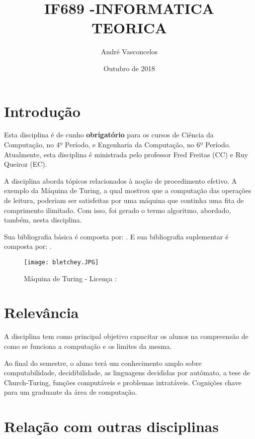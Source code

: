\documentclass{article}
\title{IF689 -INFORMATICA TEORICA}
\author{André Vasconcelos}
\date{Outubro de 2018}
\begin{document}
\maketitle

\section{Introdução}
Esta disciplina é de cunho \textbf{obrigatório} para os cursos de Ciência da Computação, no 4º Período, e Engenharia da Computação, no 6º Período. Atualmente, esta disciplina é ministrada pelo professor Fred Freitas (CC) e Ruy Queiroz (EC).

A disciplina aborda tópicos relacionados à noção de procedimento efetivo. A exemplo da Máquina de Turing, a qual mostrou que a computação das operações de leitura, poderiam ser satisfeitas por uma máquina que continha uma fita de comprimento ilimitado. Com isso, foi gerado o termo algoritmo, abordado, também, nesta disciplina.

Sua bibliografia básica é composta por: \cite{1}. E sua bibliografia suplementar é composta por: \cite{2} \cite{3} \cite{4} \cite{5}.
    \begin{figure}[h!]
    \centering
    \texttt{[image: bletchey.JPG]}
    \caption{Máquina de Turing - Licença : \cite{10}}
    \label{fig:universe}
    \end{figure}
    
    
\section{Relevância}
A disciplina tem como principal objetivo capacitar os alunos na compreensão de como se funciona a computação e os limites da mesma.

Ao final do semestre, o aluno terá um conhecimento amplo sobre computabilidade, decidibilidade, as linguagens decididas por autômato, a tese de Church-Turing, funções computáveis e problemas intratáveis. Cognições chave para um graduante da área de computação.
\section{Relação com outras disciplinas}
\end{document}
